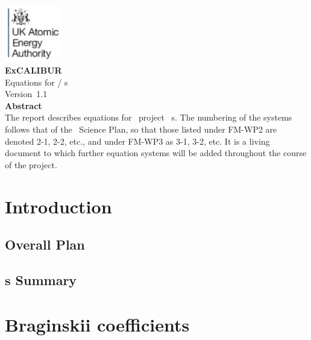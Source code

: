 \documentclass[11pt,twoside,a4paper]{article}
\newcommand{\culhamtitle}{\LARGE Equations for \exc/\nep \; \Papp s  \\[1.0\baselineskip] Version~1.1 }%
\begin{document}
\begin{titlepage}%
\vspace*{-30mm}%
\includegraphics[width=2.5cm]{../corpics/cofaplus} \\[2.0\baselineskip]%
{\LARGE {\textbf{\textsf{ExCALIBUR}}}}\\[2.0\baselineskip]%
{\LARGE \culhamtitle } \\[2.0\baselineskip]%
{\textbf{\textsf{Abstract}}}\\%
The report describes equations for \exc \ project \nep \ \Papp s.  %
The numbering of the systems follows that of the \nep\ Science Plan, so %
that those listed under FM-WP2 are denoted 2-1, 2-2, etc., and %
under FM-WP3 as 3-1, 3-2, etc. It is a living document to which further equation %
systems will be added throughout the course of the project.%
\end{titlepage}%



\clearpage
\section{Introduction}\label{sec:intro}

\subsection{Overall Plan}\label{sec:plana}

\subsection{\Papp s Summary}\label{sec:papp}

\section{Braginskii coefficients}\label{sec:bragin}

\clearpage
\end{document}
